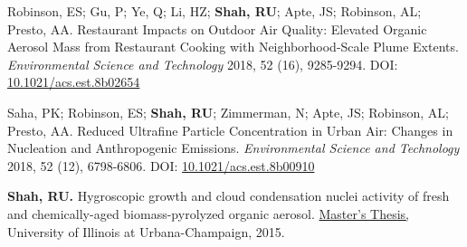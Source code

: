 \documentclass{article}
\begin{document}
\begin{etaremune}
\item Robinson, ES; Gu, P; Ye, Q; Li, HZ; \textbf{Shah, RU}; Apte, JS; Robinson, AL; Presto, AA. Restaurant Impacts on Outdoor Air Quality: Elevated Organic Aerosol Mass from Restaurant Cooking with Neighborhood-Scale Plume Extents. \textit{Environmental Science and Technology} 2018, 52 (16), 9285-9294. DOI: \href{http://pubs.acs.org/doi/10.1021/acs.est.8b02654}{10.1021/acs.est.8b02654}
\item Saha, PK; Robinson, ES; \textbf{Shah, RU}; Zimmerman, N; Apte, JS; Robinson, AL; Presto, AA. Reduced Ultrafine Particle Concentration in Urban Air: Changes in Nucleation and Anthropogenic Emissions. \textit{Environmental Science and Technology} 2018, 52 (12), 6798-6806. DOI: \href{http://pubs.acs.org/doi/10.1021/acs.est.8b00910}{10.1021/acs.est.8b00910}
\item \textbf{Shah, RU.} Hygroscopic growth and cloud condensation nuclei activity of fresh and chemically-aged biomass-pyrolyzed organic aerosol. \href{https://www.ideals.illinois.edu/handle/2142/88130}{Master's Thesis,} University of Illinois at Urbana-Champaign, 2015.
\end{etaremune}
\end{document}
